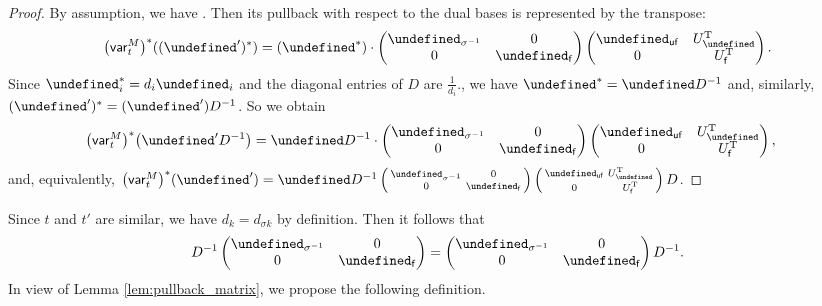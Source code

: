 \documentclass[10pt,a4paper]{amsart}
\newcommand{\opname}[1]{\operatorname{\mathsf{#1}}}
\newcommand{\var}{\opname{var}}
\newcommand{\fv}{\opname{f}}
\newcommand{\ufv}{\opname{uf}}
\let\Id\undefined
\let\trans\undefined
\let\ee\undefined
\let\ff\undefined
\let\uee\undefined
\let\uff\undefined
\let\low\undefined
\newcommand{\Id}{{\opname{Id}}}
\newcommand{\trans}{\opname{P}}
\newcommand{\ee}{\mathbf{e}}
\newcommand{\ff}{\mathbf{f}}
\newcommand{\uee}{\underline{\ee}}
\newcommand{\uff}{\underline{\ff}}
\newcommand{\low}{\opname{\fv,\ufv}}
\numberwithin{equation}{section}
\begin{document}
\begin{proof}

By assumption, we have \smash{$\var_{t}^{M}(\uff)=\uff'\cdot\left(\begin{smallmatrix}
\Id_{\ufv} & 0\\
U_{\low} & U_{\fv}
\end{smallmatrix}\right)\left(\begin{smallmatrix}
\trans_{\sigma} & 0\\
0 & \Id_{\fv}
\end{smallmatrix}\right)$}. Then its pullback with respect to the dual bases is represented
by the transpose:
\begin{gather*}
\bigl(\var_{t}^{M}\bigr)^{*}((\uff')^{*}) = (\uff^{*})\cdot\begin{pmatrix}
\trans_{\sigma^{-1}} & 0\\
0 & \Id_{\fv}
\end{pmatrix}\begin{pmatrix}
\Id_{\ufv} & U_{\low}^{\rm T}\\
0 & U_{\fv}^{\rm T}
\end{pmatrix}.
\end{gather*}
Since $\ff_{i}^{*}=d_{i}\ee_{i}$ and the diagonal entries of $D$
are $\frac{1}{d_{i}}$., we have $\uff^{*}=\uee D^{-1}$ and, similarly,
$(\uff')^{*}=(\uee')D^{-1}$. So we obtain
\begin{align*}
\bigl(\var_{t}^{M}\bigr)^{*}\bigl(\uee'D^{-1}\bigr) & =\uee D^{-1}\cdot\begin{pmatrix}
\trans_{\sigma^{-1}} & 0\\
0 & \Id_{\fv}
\end{pmatrix}\begin{pmatrix}
\Id_{\ufv} & U_{\low}^{\rm T}\\
0 & U_{\fv}^{\rm T}
\end{pmatrix},
\end{align*}
and, equivalently, $\bigl(\var_{t}^{M}\bigr)^{*}(\uee')=\uee D^{-1}\left(\begin{smallmatrix}
\trans_{\sigma^{-1}} & 0\\
0 & \Id_{\fv}
\end{smallmatrix}\right)\left(\begin{smallmatrix}
\Id_{\ufv} & U_{\low}^{\rm T}\\
0 & U_{\fv}^{\rm T}
\end{smallmatrix}\right)D$.
\end{proof}

Since $t$ and $t'$ are similar, we have $d_{k}=d_{\sigma k}$ by
definition. Then it follows that \[D^{-1}\begin{pmatrix}
\trans_{\sigma^{-1}} & 0\\
0 & \Id_{\fv}
\end{pmatrix}=\begin{pmatrix}
\trans_{\sigma^{-1}} & 0\\
0 & \Id_{\fv}
\end{pmatrix}D^{-1}.\] In view of Lemma \ref{lem:pullback_matrix}, we propose the following
definition.
\end{document}
